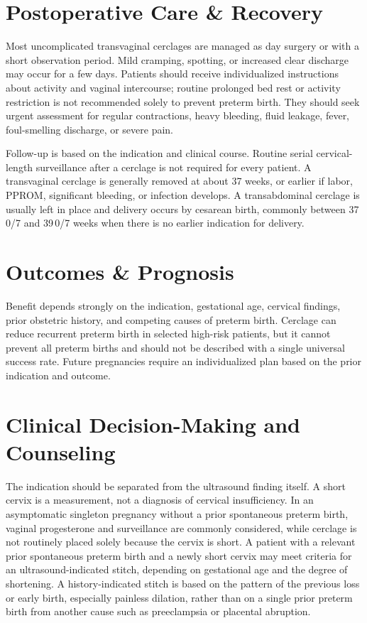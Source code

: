 \section*{Postoperative Care \& Recovery}
Most uncomplicated transvaginal cerclages are managed as day surgery or with a short observation period. Mild cramping, spotting, or increased clear discharge may occur for a few days. Patients should receive individualized instructions about activity and vaginal intercourse; routine prolonged bed rest or activity restriction is not recommended solely to prevent preterm birth. They should seek urgent assessment for regular contractions, heavy bleeding, fluid leakage, fever, foul-smelling discharge, or severe pain.

Follow-up is based on the indication and clinical course. Routine serial cervical-length surveillance after a cerclage is not required for every patient. A transvaginal cerclage is generally removed at about 37 weeks, or earlier if labor, PPROM, significant bleeding, or infection develops. A transabdominal cerclage is usually left in place and delivery occurs by cesarean birth, commonly between 37\,0/7 and 39\,0/7 weeks when there is no earlier indication for delivery.

\section*{Outcomes \& Prognosis}
Benefit depends strongly on the indication, gestational age, cervical findings, prior obstetric history, and competing causes of preterm birth. Cerclage can reduce recurrent preterm birth in selected high-risk patients, but it cannot prevent all preterm births and should not be described with a single universal success rate. Future pregnancies require an individualized plan based on the prior indication and outcome.

\section*{Clinical Decision-Making and Counseling}
The indication should be separated from the ultrasound finding itself. A short cervix is a measurement, not a diagnosis of cervical insufficiency. In an asymptomatic singleton pregnancy without a prior spontaneous preterm birth, vaginal progesterone and surveillance are commonly considered, while cerclage is not routinely placed solely because the cervix is short. A patient with a relevant prior spontaneous preterm birth and a newly short cervix may meet criteria for an ultrasound-indicated stitch, depending on gestational age and the degree of shortening. A history-indicated stitch is based on the pattern of the previous loss or early birth, especially painless dilation, rather than on a single prior preterm birth from another cause such as preeclampsia or placental abruption.

